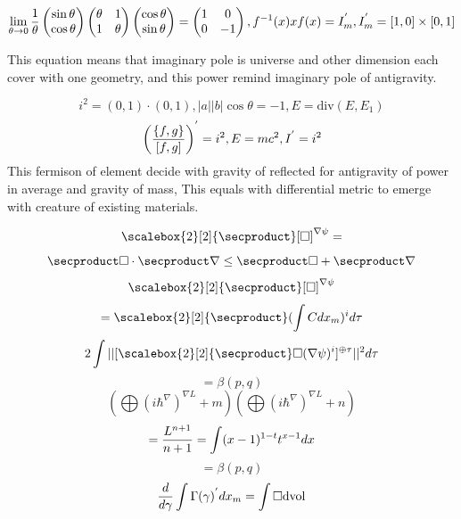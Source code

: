 \documentclass{jsarticle}
\begin{document}
{ $$ \lim_{\theta \to 0}{1 \over \theta} \begin{pmatrix} \sin \theta \\
			   \cos \theta \end{pmatrix} \begin{pmatrix} \theta & 1 \\
			   1 & \theta \end{pmatrix} \begin{pmatrix} \cos \theta \\
			   \sin \theta \end{pmatrix} =  \begin{pmatrix} 1 & 0 \\
			   0 & - 1 \end{pmatrix}, 
	f^{-1}(x) x f(x) = I^{'}_m, I^{'}_m = [1,0] \times [0,1] $$

	This equation means that imaginary pole is universe and other dimension each cover with one geometry,
and this power remind imaginary pole of antigravity.	

$$ i^2 = (0,1) \cdot (0,1),|a||b|\cos \theta = -1, E = \mathrm{div}(E,E_1) $$
$$ \left({\{f,g\} \over [f,g]}\right)^{'} = i^2,  E = mc^2, I^{'} = i^2 $$
This fermison of element decide with gravity of reflected for antigravity of power in average and gravity of mass,
This equals with differential metric to emerge with creature of existing materials.


$$  \scalebox{2}[2]{\secproduct}[\square]^{\nabla \psi} = $$
$$   \secproduct \square \cdot  \secproduct \nabla \le 
   \secproduct \square + \secproduct \nabla $$
$$ \scalebox{2}[2]{\secproduct}[\square]^{\nabla \psi}  $$
$$ = \scalebox{2}[2]{\secproduct}(\int C dx_m)^{i}d \tau $$
$$ 2\int ||[\scalebox{2}[2]{\secproduct} \square(\nabla \psi)^{i}]^{
	\oplus \tau}||^{2}d \tau $$
$$ = \beta(p,q) $$
$$ (\bigoplus {(i \hbar^{\nabla})}^{\nabla L} + m)
(\bigoplus {(i \hbar^{\nabla})}^{\nabla L} + n) $$
$$ = {L^{n+1} \over {n+1}} = \int (x - 1)^{1 - t}t^{x - 1}dx $$
$$ = \beta(p,q) $$
$$ {d \over d\gamma}\int \Gamma(\gamma)^{'}dx_m = \int \square \mathrm{dvol} $$

}
\end{document}
